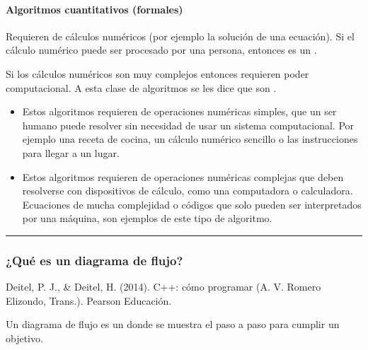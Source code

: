 \documentclass[letterpaper,10pt,spanish]{sphinxmanual}
\begin{document}
\paragraph{Algoritmos cuantitativos (formales)}
\label{\detokenize{1_guias/10programacion/G1023:algoritmos-cuantitativos-formales}}
\sphinxAtStartPar
Requieren de cálculos numéricos (por ejemplo la solución de una ecuación). Si el cálculo numérico puede ser procesado por una persona, entonces es un .

\sphinxAtStartPar
Si los cálculos numéricos son muy complejos entonces requieren poder computacional. A esta clase de algoritmos se les dice que son .
\begin{itemize}
\item {} 
\sphinxAtStartPar
{} Estos algoritmos requieren de operaciones numéricas simples, que un ser humano puede resolver sin necesidad de usar un sistema computacional. Por ejemplo una receta de cocina, un cálculo numérico sencillo o las instrucciones para llegar a un lugar.

\item {} 
\sphinxAtStartPar
{} Estos algoritmos requieren de operaciones numéricas complejas que deben resolverse con dispositivos de cálculo, como una computadora o calculadora. Ecuaciones de mucha complejidad o códigos que solo pueden ser interpretados por una máquina, son ejemplos de este tipo de algoritmo.

\end{itemize}


\bigskip\hrule\bigskip



\subsubsection{¿Qué es un diagrama de flujo?}
\label{\detokenize{1_guias/10programacion/G1023:que-es-un-diagrama-de-flujo}}
\sphinxAtStartPar
%
\begin{footnote}[1]\sphinxAtStartFootnote
Deitel, P. J., \& Deitel, H. (2014). C++: cómo programar (A. V. Romero Elizondo, Trans.). Pearson Educación.
%
\end{footnote} Un diagrama de flujo es un  donde se muestra el paso a paso para cumplir un objetivo.
\end{document}
